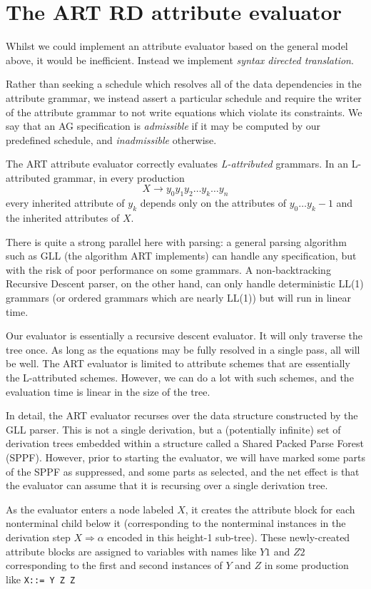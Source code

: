 \section{The ART RD attribute evaluator}
Whilst we could implement an attribute evaluator based on the general
model above, it would be inefficient. Instead we implement {\em syntax
  directed translation}.

Rather than seeking a schedule which resolves all of the data
dependencies in the attribute grammar, we instead assert a particular
schedule and require the writer of the attribute grammar to not write
equations which violate its constraints. We say that an AG
specification is {\em admissible} if it may be computed by our
predefined schedule, and {\em inadmissible} otherwise.

The ART attribute evaluator correctly evaluates {\em L-attributed} grammars. In an L-attributed grammar, in every production
\[
X \rightarrow y_0 y_1 y_2 \ldots y_k \ldots y_n
\]
every inherited attribute of $y_k$ depends only on the attributes of $y_0\ldots y_k-1$ and the inherited attributes of $X$.


There is quite a strong parallel here with parsing: a general parsing
algorithm such as GLL (the algorithm ART implements) can handle any
specification, but with the risk of poor performance on some
grammars. A non-backtracking Recursive Descent parser, on the other hand, can only
handle deterministic LL(1) grammars (or ordered grammars which are nearly LL(1)) but
will run in linear time.

Our evaluator is essentially a recursive descent evaluator. It will
only traverse the tree once. As long as the equations may be fully
resolved in a single pass, all will be well. The ART evaluator is
limited to attribute schemes that are essentially the L-attributed
schemes. However, we can do a lot with such schemes, and the
evaluation time is linear in the size of the tree.

In detail, the ART evaluator recurses over the data structure
constructed by the GLL parser. This is not a single derivation, but a
(potentially infinite) set of derivation trees embedded within a
structure called a Shared Packed Parse Forest (SPPF). However, prior
to starting the evaluator, we will have marked some parts of the SPPF
as suppressed, and some parts as selected, and the net effect is that
the evaluator can assume that it is recursing over a single derivation
tree.

As the evaluator enters a node labeled $X$, it creates the attribute
block for each nonterminal child below it (corresponding to the
nonterminal instances in the derivation step $X\Rightarrow\alpha$
encoded in this height-1 sub-tree). These newly-created attribute
blocks are assigned to variables with names like $Y1$ and $Z2$
corresponding to the first and second instances of $Y$ and $Z$ in some
production like \verb+X::= Y Z Z+

